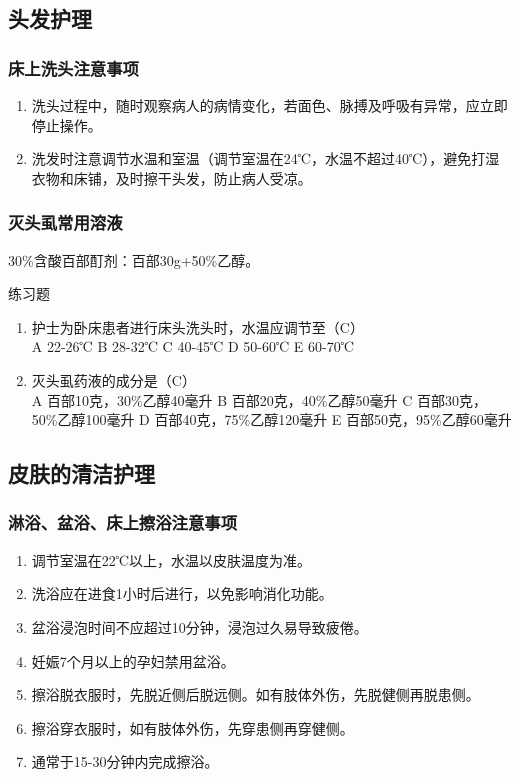 \documentclass[11pt, a4paper]{ctexart}
\begin{document}
\subsection{头发护理}
\subsubsection{床上洗头注意事项}
\begin{enumerate}
    \item 洗头过程中，随时观察病人的病情变化，若面色、脉搏及呼吸有异常，应立即停止操作。
    \item 洗发时注意调节水温和室温（调节室温在24℃，水温不超过40℃），避免打湿衣物和床铺，及时擦干头发，防止病人受凉。
\end{enumerate}

\subsubsection{灭头虱常用溶液}
30\%含酸百部酊剂：百部30g+50\%乙醇。

\begin{examplebox}{练习题}
\begin{enumerate}
    \item 护士为卧床患者进行床头洗头时，水温应调节至（C）\\
    A 22-26℃ \quad B 28-32℃ \quad C 40-45℃ \quad D 50-60℃ \quad E 60-70℃
    \item 灭头虱药液的成分是（C）\\
    A 百部10克，30\%乙醇40毫升 \quad B 百部20克，40\%乙醇50毫升 \quad C 百部30克，50\%乙醇100毫升 \quad D 百部40克，75\%乙醇120毫升 \quad E 百部50克，95\%乙醇60毫升
\end{enumerate}
\end{examplebox}

\subsection{皮肤的清洁护理}
\subsubsection{淋浴、盆浴、床上擦浴注意事项}
\begin{enumerate}
    \item 调节室温在22℃以上，水温以皮肤温度为准。
    \item 洗浴应在进食1小时后进行，以免影响消化功能。
    \item 盆浴浸泡时间不应超过10分钟，浸泡过久易导致疲倦。
    \item 妊娠7个月以上的孕妇禁用盆浴。
    \item 擦浴脱衣服时，先脱近侧后脱远侧。如有肢体外伤，先脱健侧再脱患侧。
    \item 擦浴穿衣服时，如有肢体外伤，先穿患侧再穿健侧。
    \item 通常于15-30分钟内完成擦浴。
\end{enumerate}
\end{document}
